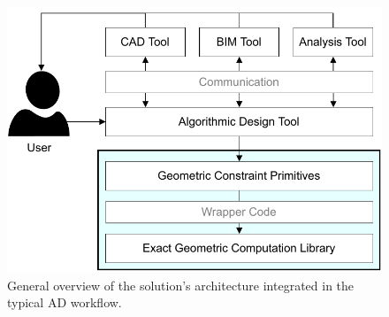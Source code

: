 \begin{figure}[htb]
  \includegraphics[width=\linewidth]{fig/solution-arch}
  \caption[Solution architecture within AD workflow]{
    General overview of the solution's architecture integrated in the typical
    \acs{AD} workflow.}%
  \label{fig:solution.arch}
\end{figure}



